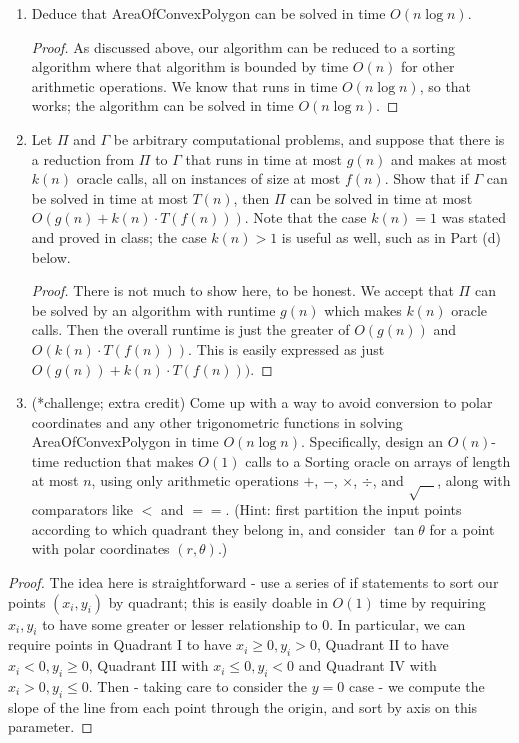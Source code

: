 \documentclass[11pt]{article}
\begin{document}
\begin{enumerate}
\begin{enumerate}
        \item Deduce that AreaOfConvexPolygon can be solved in time $O(n\log n)$.
        
\begin{proof}
As discussed above, our algorithm can be reduced to a sorting algorithm where that algorithm is bounded by time $O(n)$ for other arithmetic operations. We know that \MergeSort runs in time $O (n \log n)$, so that works; the algorithm can be solved in time $O(n \log n)$.
\end{proof}


        \item Let $\Pi$ and $\Gamma$ be arbitrary computational problems, and suppose that there is a reduction from $\Pi$ to $\Gamma$ that runs in time at most $g(n)$ and makes at most $k(n)$ oracle calls, all on instances of size at most $f(n)$.  Show that if $\Gamma$ can be solved in time at most $T(n)$, then $\Pi$ can be solved in time at most $O(g(n)+k(n)\cdot T(f(n)))$. Note that the case $k(n)=1$ was stated and proved in class; the case $k(n)>1$ is useful as well, such as in Part (d) below.
        
\begin{proof}
There is not much to show here, to be honest. We accept that $\Pi$ can be solved by an algorithm with runtime $g(n)$ which makes $k(n)$ oracle calls. Then the overall runtime is just the greater of $O(g(n))$ and $O(k(n) \cdot T(f(n)))$. This is easily expressed as just $O(g(n)) + k(n) \cdot T(f(n)))$.
\end{proof}
        
        \item (*challenge; extra credit) Come up with a way to avoid conversion to polar coordinates and any other trigonometric functions in solving AreaOfConvexPolygon in time $O(n\log n)$.  Specifically, design an $O(n)$-time reduction that makes $O(1)$ calls to a Sorting oracle on arrays of length at most $n$, using only arithmetic operations $+$, $-$, $\times$, $\div$, and $\sqrt{\hspace{1em}}$, along with comparators like $<$ and $==$.  (Hint: first partition the input points according to which quadrant they belong in, and consider $\tan\theta$ for a point with polar coordinates $(r,\theta)$.) 
        \end{enumerate}

\begin{proof}
The idea here is straightforward - use a series of if statements to sort our points $(x_i, y_i)$ by quadrant; this is easily doable in $O(1)$ time by requiring $x_i, y_i$ to have some greater or lesser relationship to 0. In particular, we can require points in Quadrant I to have $x_i \geq 0, y_i > 0$, Quadrant II to have $x_i < 0, y_i \geq 0$, Quadrant III with $x_i \leq 0, y_i < 0$ and Quadrant IV with $x_i > 0, y_i \leq 0$. Then - taking care to consider the $y = 0$ case - we compute the slope of the line from each point through the origin, and sort by axis on this parameter.
\end{proof}
    

\end{enumerate}
\end{document}
